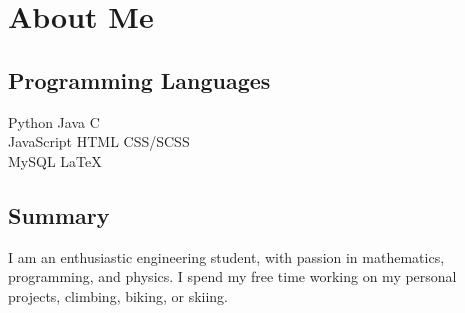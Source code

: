 \documentclass[]{deedy-resume-openfont}
\begin{document}
\section{About Me}
\begin{minipage}[t]{.35\textwidth}
	\subsection{Programming Languages}
	Python \textbullet{} Java \textbullet{} C \\
	JavaScript \textbullet{} HTML \textbullet{} CSS/SCSS \\
	MySQL \textbullet{} \LaTeX
	\sectionsep
\end{minipage}
\hfill
\begin{minipage}[t]{.55\textwidth}
	\subsection{Summary}
	I am an enthusiastic engineering student, with passion in mathematics, programming, and physics. I spend my free time working on my personal projects, climbing, biking, or skiing.

	\vspace{15pt}

\end{minipage}
\end{document}
